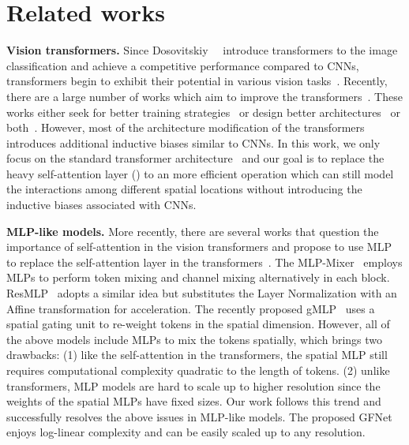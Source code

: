 \documentclass{article}
\numberwithin{equation}{section}
\newcommand{\gknet}{GFNet}
\newcommand{\paragrapha}[2][1pt]{\vspace{#1}\noindent\textbf{#2}}
\begin{document}
\section{Related works}
\paragrapha{Vision transformers. } Since Dosovitskiy~\etal~\cite{dosovitskiy2020vit} introduce transformers to the image classification and achieve a competitive performance compared to CNNs, transformers begin to exhibit their potential in various vision tasks~\cite{carion2020detr,TransTracking,setr}. Recently, there are a large number of works which aim to improve the transformers~\cite{touvron2020deit,touvron2021cait,liu2021swin,wu2021cvt,jiang2021token,gong2021improve,yuan2021t2t}. These works either seek for better training strategies~\cite{touvron2020deit,gong2021improve} or design better architectures~\cite{liu2021swin,wu2021cvt,yuan2021t2t} or both~\cite{touvron2021cait,gong2021improve}. However, most of the architecture modification of the transformers~\cite{wu2021cvt,jiang2021token,liu2021swin,yuan2021t2t} introduces additional inductive biases similar to CNNs. In this work, we only focus on the standard transformer architecture~\cite{dosovitskiy2020vit,touvron2020deit} and our goal is to replace the heavy self-attention layer () to an more efficient operation which can still model the interactions among different spatial locations without introducing the inductive biases associated with CNNs.

\paragrapha{MLP-like models. } More recently, there are several works that question the importance of self-attention in the vision transformers and propose to use MLP to replace the self-attention layer in the transformers~\cite{tolstikhin2021mlp,touvron2021resmlp,liu2021pay}. The MLP-Mixer~\cite{tolstikhin2021mlp} employs  MLPs to perform token mixing and channel mixing alternatively in each block. ResMLP~\cite{touvron2021resmlp} adopts a similar idea but substitutes the Layer Normalization with an Affine transformation for acceleration. The recently proposed gMLP~\cite{liu2021pay} uses a spatial gating unit to re-weight tokens in the spatial dimension. However, all of the above models include MLPs to mix the tokens spatially, which brings two drawbacks: (1) like the self-attention in the transformers, the spatial MLP still requires computational complexity quadratic to the length of tokens. (2) unlike transformers, MLP models are hard to scale up to higher resolution since the weights of the spatial MLPs have fixed sizes. Our work follows this trend and successfully resolves the above issues in MLP-like models. The proposed \gknet{} enjoys log-linear complexity and can be easily scaled up to any resolution.
\end{document}
